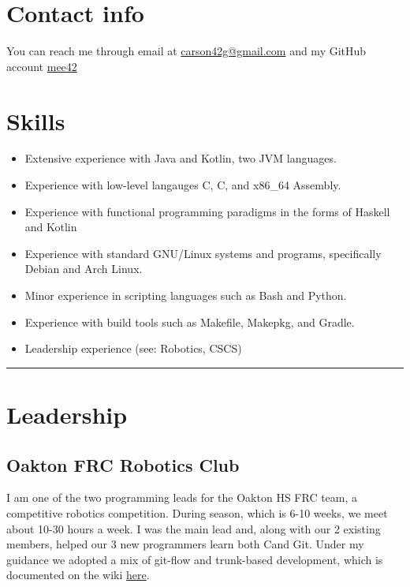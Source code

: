 \documentclass[10pt,letterpaper]{article}
\title{}
\author{Carson Graham}
\date{}
\newcommand{\CPP}
{C\nolinebreak[4]\hspace{-.05em}\raisebox{.35ex}{\footnotesize\bf ++}}
\begin{document}
    \maketitle

    \section*{Contact info}

        You can reach me through email at \href{mailto:carson42g@gmail.com}{carson42g@gmail.com}
        and my GitHub account \href{https://github.com/mee42/}{mee42}

    \section*{Skills}

    \begin{itemize}
        \item Extensive experience with Java and Kotlin, two JVM languages.
        \item Experience with low-level langauges C, \CPP, and x86\_64 Assembly.
        \item Experience with functional programming paradigms in the forms of Haskell and Kotlin
        \item Experience with standard GNU/Linux systems and programs, specifically Debian and Arch Linux.
        \item Minor experience in scripting languages such as Bash and Python.
        \item Experience with build tools such as Makefile, Makepkg, and Gradle.
        \item Leadership experience (see: Robotics, CSCS)
    \end{itemize}

    \hrule
    \vspace{-0.4em}

    \section*{Leadership}
    \subsection*{Oakton FRC Robotics Club}

    I am one of the two programming leads for the Oakton HS FRC team,
    a competitive robotics competition.
    During season, which is 6-10 weeks, we meet about 10-30 hours a week.
    I was the main lead and, along with our 2 existing members,
    helped our 3 new programmers learn both \CPP and Git.
    Under my guidance we adopted a mix of git-flow and trunk-based development,
    which is documented on the wiki \href{https://github.com/CougarProgramming623/InfiniteRecharge/wiki/Git}{here}.
\end{document}
